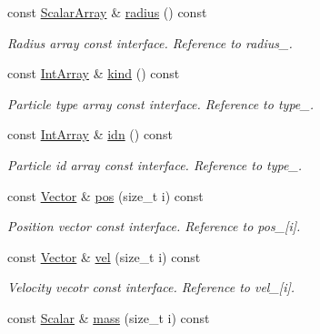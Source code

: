 \begin{DoxyCompactItemize}
const \mbox{\hyperlink{class_vel_indep_particles_abd6e6b0ffbbab4ebc078efd77f6a365a}{Scalar\+Array}} \& \mbox{\hyperlink{class_vel_indep_particles_a764cb67485dbd51be3509177df6c355a}{radius}} () const
\begin{DoxyCompactList}\small\item\em Radius array const interface. Reference to radius\+\_\+. \end{DoxyCompactList}\item 
const \mbox{\hyperlink{class_vel_indep_particles_a5e4f20d435c71a5f4179143206258a81}{Int\+Array}} \& \mbox{\hyperlink{class_vel_indep_particles_a81ca7cfb6c53e5d29c3afc24ff25877d}{kind}} () const
\begin{DoxyCompactList}\small\item\em Particle type array const interface. Reference to type\+\_\+. \end{DoxyCompactList}\item 
const \mbox{\hyperlink{class_vel_indep_particles_a5e4f20d435c71a5f4179143206258a81}{Int\+Array}} \& \mbox{\hyperlink{class_vel_indep_particles_a5b43130b3d3a94f5e2336e4e0ca78cf4}{idn}} () const
\begin{DoxyCompactList}\small\item\em Particle id array const interface. Reference to type\+\_\+. \end{DoxyCompactList}\item 
const \mbox{\hyperlink{class_vel_indep_particles_aa7e03da81f44941c06abf43ec2180079}{Vector}} \& \mbox{\hyperlink{class_vel_indep_particles_a7a48693c77efda8b2ec9d264603e58d8}{pos}} (size\+\_\+t i) const
\begin{DoxyCompactList}\small\item\em Position vector const interface. Reference to pos\+\_\+\mbox{[}i\mbox{]}. \end{DoxyCompactList}\item 
const \mbox{\hyperlink{class_vel_indep_particles_aa7e03da81f44941c06abf43ec2180079}{Vector}} \& \mbox{\hyperlink{class_vel_indep_particles_ae5dd02185d239bb0fa5eeeae5a2aec6f}{vel}} (size\+\_\+t i) const
\begin{DoxyCompactList}\small\item\em Velocity vecotr const interface. Reference to vel\+\_\+\mbox{[}i\mbox{]}. \end{DoxyCompactList}\item 
const \mbox{\hyperlink{class_vel_indep_particles_a5d275b22f0d759f360ddd80e78f4b466}{Scalar}} \& \mbox{\hyperlink{class_vel_indep_particles_a5c9b3e93851ab043136e09abcfbff926}{mass}} (size\+\_\+t i) const

\end{DoxyCompactItemize}
